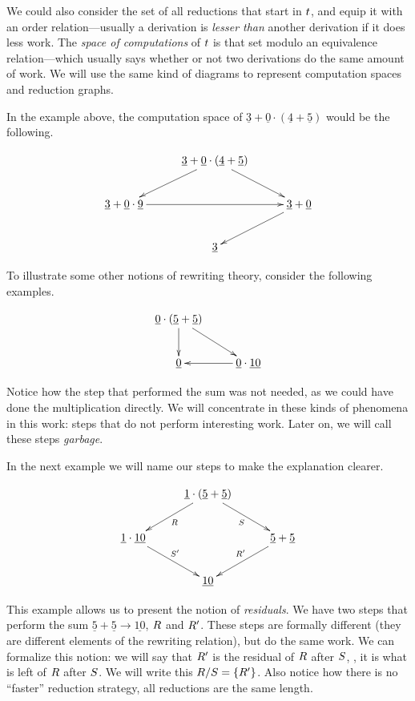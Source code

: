 We could also consider the set of all reductions that
start in $t$, and equip it with an order relation---usually a derivation
is \emph{lesser than} another derivation if it does less work.
The \emph{space of computations} of $t$ is that set modulo an equivalence relation---which
usually says whether or not two derivations do the same amount of work.
We will use the same kind of diagrams to represent computation spaces and reduction graphs.

In the example above, the computation space of $\underline{3} + \underline{0} \cdot (\underline{4} + \underline{5})$
would be the following.

\[
\xymatrix@C=1cm{
  & \underline{3} + \underline{0} \cdot (\underline{4} + \underline{5}) \ar[dr] \ar[dl]& \\
  \underline{3} + \underline{0} \cdot \underline{9} \ar[rr] & & \underline{3} + \underline{0} \ar[dl] \\
  & \underline{3} &
}
\]

To illustrate some other notions of rewriting theory, consider the following examples.

\[
\xymatrix{
  \underline{0} \cdot (\underline{5} + \underline{5}) \ar[d] \ar[dr] &                                           \\
  \underline{0}                                                      & \ar[l] \underline{0} \cdot \underline{10}
}
\]

Notice how the step that performed the sum was not needed, as we could have done the multiplication
directly. We will concentrate in these kinds of phenomena in this work: steps that do not perform interesting
work. Later on, we will call these steps \emph{garbage}.

In the next example we will name our steps to make the explanation clearer.

\[
\xymatrix@C=1cm{
  & \underline{1} \cdot (\underline{5} + \underline{5}) \ar[dl]^{\redex} \ar[dr]_{\redextwo}& \\
\underline{1} \cdot \underline{10} \ar[dr]^{\redextwo'} & & \underline{5} + \underline{5} \ar[dl]_{\redex'} \\
  & \underline{10} &
}
\]

\noindent
This example allows us to present the notion of \emph{residuals}. We have two
steps that perform the sum $\underline{5} + \underline{5} \to \underline{10}$, $R$ and $R'$.
These steps are formally different (they are different elements of the rewriting relation),
but do the same work. We can formalize this notion:
we will say that $R'$ is the residual of $R$ after $S$, \ie, it is what is left of $R$
after $S$. We will write this $R / S = \{R'\}$.
Also notice how there is no ``faster'' reduction  strategy, all reductions are the same length.

